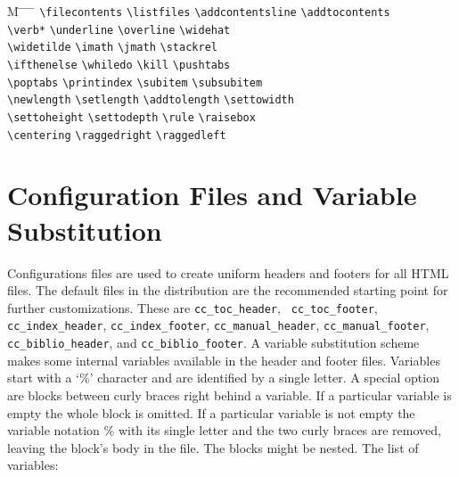 \documentclass[11pt]{article}
\begin{document}
\begin{tabbing}
  M \= \hspace*{0.24\textwidth} \= \hspace*{0.24\textwidth} 
    \= \hspace*{0.24\textwidth} \=  \kill
  \>\verb+\filecontents+ \>    \verb+\listfiles+ \>
    \verb+\addcontentsline+ \>    \verb+\addtocontents+\\
  \>\verb+\verb*+ \>    \verb+\underline+ \>
    \verb+\overline+ \>    \verb+\widehat+\\
  \>\verb+\widetilde+ \>    \verb+\imath+ \>
    \verb+\jmath+ \>    \verb+\stackrel+\\
  \>\verb+\ifthenelse+ \>    \verb+\whiledo+ \>
    \verb+\kill+ \>    \verb+\pushtabs+\\
  \>\verb+\poptabs+ \>    \verb+\printindex+ \>
    \verb+\subitem+ \>    \verb+\subsubitem+\\
  \>\verb+\newlength+ \>    \verb+\setlength+ \>
    \verb+\addtolength+ \>    \verb+\settowidth+\\
  \>\verb+\settoheight+ \>    \verb+\settodepth+ \>
    \verb+\rule+ \>    \verb+\raisebox+\\
  \>\verb+\centering+ \>    \verb+\raggedright+ \>
    \verb+\raggedleft+
\end{tabbing}

\section{Configuration Files and Variable Substitution}

 Configurations files are
used to create uniform headers and footers for all HTML files.  The
default files in the distribution are the recommended starting point
for further customizations. These are {\tt cc\_toc\_header}, {\tt
  cc\_toc\_footer}, {\tt cc\_index\_header}, {\tt cc\_index\_footer},
{\tt cc\_manual\_header}, {\tt cc\_manual\_footer}, {\tt
  cc\_biblio\_header}, and {\tt cc\_biblio\_footer}.  A variable
substitution scheme makes some internal variables available in the
header and footer files. Variables start with a `\%' character and are
identified by a single letter. A special option are blocks between
curly braces right behind a variable. If a particular variable is
empty the whole block is omitted. If a particular variable is not
empty the variable notation \% with its single letter and the two
curly braces are removed, leaving the block's body in the file. The
blocks might be nested. The list of variables:
\end{document}
